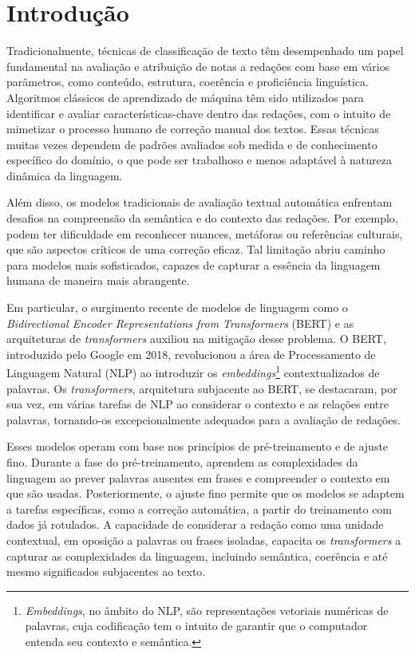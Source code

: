 
\chapter{Introdução}

Tradicionalmente, técnicas de classificação de texto têm desempenhado um papel fundamental na avaliação e atribuição de notas a redações com base em vários parâmetros, como conteúdo, estrutura, coerência e proficiência linguística. Algoritmos clássicos de aprendizado de máquina têm sido utilizados para identificar e avaliar características-chave dentro das redações, com o intuito de mimetizar o processo humano de correção manual dos textos. Essas técnicas muitas vezes dependem de padrões avaliados sob medida e de conhecimento específico do domínio, o que pode ser trabalhoso e menos adaptável à natureza dinâmica da linguagem.

Além disso, os modelos tradicionais de avaliação textual automática enfrentam desafios na compreensão da semântica e do contexto das redações. Por exemplo, podem ter dificuldade em reconhecer nuances, metáforas ou referências culturais, que são aspectos críticos de uma correção eficaz. Tal limitação abriu caminho para modelos mais sofisticados, capazes de capturar a essência da linguagem humana de maneira mais abrangente.

Em particular, o surgimento recente de modelos de linguagem como o \textit{Bidirectional Encoder Representations from Transformers} (BERT) e as arquiteturas de \textit{transformers} auxiliou na mitigação desse problema. O BERT, introduzido pelo Google em 2018, revolucionou a área de Processamento de Linguagem Natural (NLP) ao introduzir os \textit{embeddings}\footnote{\textit{Embeddings}, no âmbito do NLP, são representações vetoriais numéricas de palavras, cuja codificação tem o intuito de garantir que o computador entenda seu contexto e semântica.} contextualizados de palavras. Os \textit{transformers}, arquitetura subjacente ao BERT, se destacaram, por sua vez, em várias tarefas de NLP ao considerar o contexto e as relações entre palavras, tornando-os excepcionalmente adequados para a avaliação de redações.

Esses modelos operam com base nos princípios de pré-treinamento e de ajuste fino. Durante a fase do pré-treinamento, aprendem as complexidades da linguagem ao prever palavras ausentes em frases e compreender o contexto em que são usadas. Posteriormente, o ajuste fino permite que os modelos se adaptem a tarefas específicas, como a correção automática, a partir do treinamento com dados já rotulados. A capacidade de considerar a redação como uma unidade contextual, em oposição a palavras ou frases isoladas, capacita os \textit{transformers} a capturar as complexidades da linguagem, incluindo semântica, coerência e até mesmo significados subjacentes ao texto.

